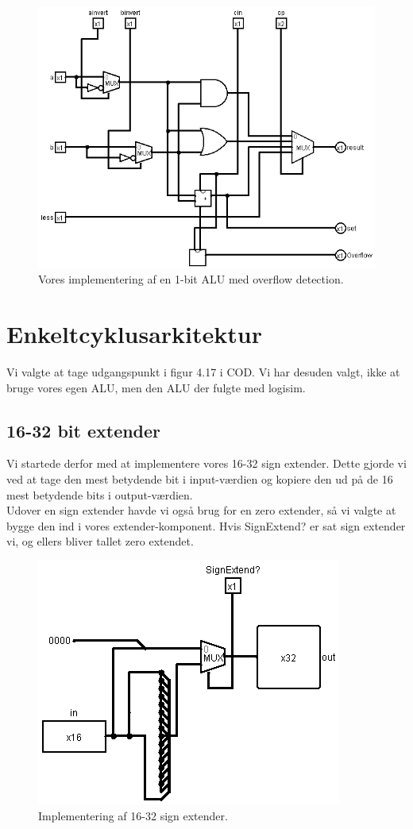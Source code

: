 \documentclass [10pt,a4paper]{article}
\begin{document}
\begin{figure}[h!]
  \centering  
    \includegraphics[scale=0.7]{ALUoverflow.png}
  \caption{Vores implementering af en 1-bit ALU med overflow detection.}
\end{figure}

\section*{Enkeltcyklusarkitektur}
Vi valgte at tage udgangspunkt i figur 4.17 i COD. Vi har desuden
valgt, ikke at bruge vores egen ALU, men den ALU der fulgte med
logisim.

\subsection*{16-32 bit extender}
Vi startede derfor med at implementere vores 16-32 sign
extender. Dette gjorde vi ved at tage den mest betydende bit i
input-værdien og kopiere den ud på de 16 mest betydende bits i
output-værdien.\\
Udover en sign extender havde vi også brug for en zero extender, så vi
valgte at bygge den ind i vores extender-komponent. Hvis SignExtend?
er sat sign extender vi, og ellers bliver tallet zero extendet.


\begin{figure}[h!]
  \centering  
    \includegraphics[scale=0.7]{bitextender.png}
  \caption{Implementering af 16-32 sign extender.}
\end{figure}
\end{document}

